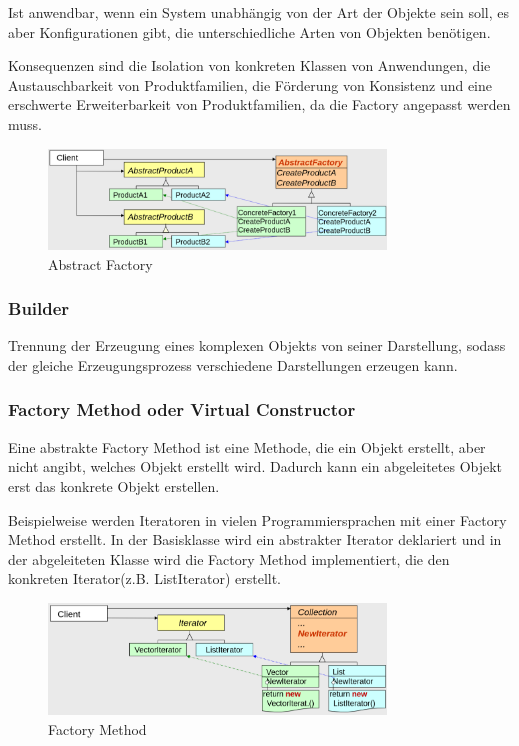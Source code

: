 \documentclass[12pt]{scrartcl}
\begin{document}
Ist anwendbar, wenn ein System unabhängig von der Art der Objekte sein soll, es aber Konfigurationen gibt, die unterschiedliche Arten von Objekten benötigen.

Konsequenzen sind die Isolation von konkreten Klassen von Anwendungen, die Austauschbarkeit von Produktfamilien, die Förderung von Konsistenz und
eine erschwerte Erweiterbarkeit von Produktfamilien, da die Factory angepasst werden muss.

\begin{figure}[H]
	\centering
	\includegraphics[width=0.8\textwidth]{images/muster_2.png}
	\caption{Abstract Factory}
\end{figure}

\subsubsection{Builder}

Trennung der Erzeugung eines komplexen Objekts von seiner Darstellung, sodass der gleiche Erzeugungsprozess verschiedene Darstellungen erzeugen kann.

\subsubsection{Factory Method oder Virtual Constructor}

Eine abstrakte Factory Method ist eine Methode, die ein Objekt erstellt, aber nicht angibt, welches Objekt erstellt wird. Dadurch kann ein abgeleitetes
Objekt erst das konkrete Objekt erstellen.

Beispielweise werden Iteratoren in vielen Programmiersprachen mit einer Factory Method erstellt. In der Basisklasse wird ein abstrakter Iterator deklariert
und in der abgeleiteten Klasse wird die Factory Method implementiert, die den konkreten Iterator(z.B. ListIterator) erstellt.

\begin{figure}[H]
	\centering
	\includegraphics[width=0.8\textwidth]{images/muster_3.png}
	\caption{Factory Method}
\end{figure}
\end{document}
